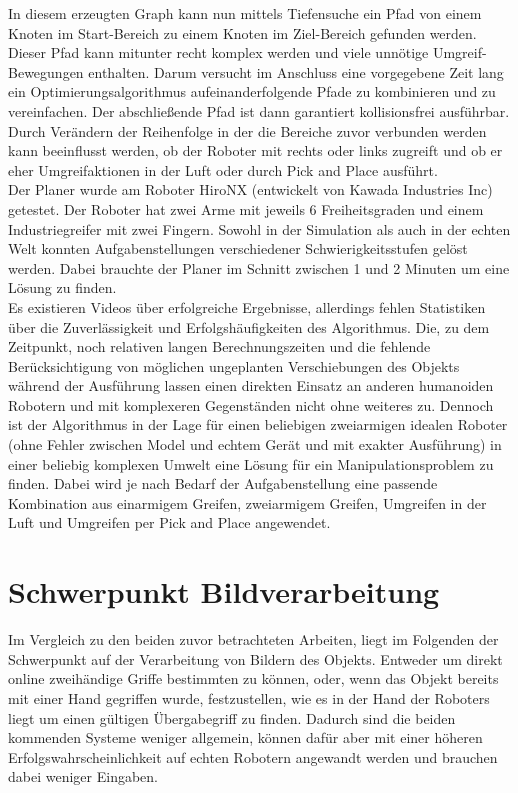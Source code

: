 In diesem erzeugten Graph kann nun mittels Tiefensuche ein Pfad von einem Knoten im Start-Bereich zu einem Knoten im Ziel-Bereich gefunden werden. Dieser Pfad kann mitunter recht komplex werden und viele unnötige Umgreif-Bewegungen enthalten. Darum versucht im Anschluss eine vorgegebene Zeit lang ein Optimierungsalgorithmus aufeinanderfolgende Pfade zu kombinieren und zu vereinfachen. Der abschließende Pfad ist dann garantiert kollisionsfrei ausführbar. \\
Durch Verändern der Reihenfolge in der die Bereiche zuvor verbunden werden kann beeinflusst werden, ob der Roboter mit rechts oder links zugreift und ob er eher Umgreifaktionen in der Luft oder durch \glqq Pick and Place \grqq{} ausführt.
\\

Der Planer wurde am Roboter HiroNX (entwickelt von Kawada Industries Inc) getestet. Der Roboter hat zwei Arme mit jeweils 6 Freiheitsgraden und einem Industriegreifer mit zwei Fingern. Sowohl in der Simulation als auch in der echten Welt konnten Aufgabenstellungen verschiedener Schwierigkeitsstufen gelöst werden. Dabei brauchte der Planer im Schnitt zwischen 1 und 2 Minuten um eine Lösung zu finden. \\
Es existieren Videos über erfolgreiche Ergebnisse, allerdings fehlen Statistiken über die Zuverlässigkeit und Erfolgshäufigkeiten des Algorithmus. Die, zu dem Zeitpunkt, noch relativen langen Berechnungszeiten und die fehlende Berücksichtigung von möglichen ungeplanten Verschiebungen des Objekts während der Ausführung lassen einen direkten Einsatz an anderen humanoiden Robotern und mit komplexeren Gegenständen nicht ohne weiteres zu. Dennoch ist der Algorithmus in der Lage für einen beliebigen zweiarmigen idealen Roboter (ohne Fehler zwischen Model und echtem Gerät und mit exakter Ausführung) in einer beliebig komplexen Umwelt eine Lösung für ein Manipulationsproblem zu finden. Dabei wird je nach Bedarf der Aufgabenstellung eine passende Kombination aus einarmigem Greifen, zweiarmigem Greifen, Umgreifen in der Luft und Umgreifen per \glqq Pick and Place \grqq{} angewendet.


\section{Schwerpunkt Bildverarbeitung}\label{sec:Bildverabeitung}

Im Vergleich zu den beiden zuvor betrachteten Arbeiten, liegt im Folgenden der Schwerpunkt auf der Verarbeitung von Bildern des Objekts. Entweder um direkt online zweihändige Griffe bestimmten zu können, oder, wenn das Objekt bereits mit einer Hand gegriffen wurde, festzustellen, wie es in der Hand der Roboters liegt um einen gültigen Übergabegriff zu finden. Dadurch sind die beiden kommenden Systeme weniger allgemein, können dafür aber mit einer höheren Erfolgswahrscheinlichkeit auf echten Robotern angewandt werden und brauchen dabei weniger Eingaben.

